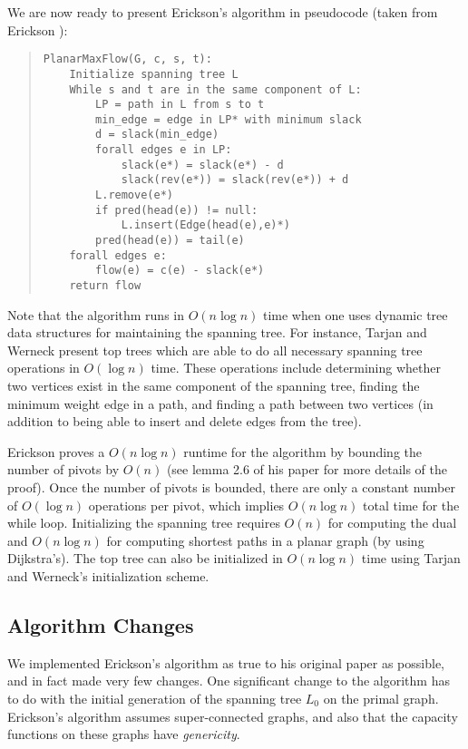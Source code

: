 \documentclass[12pt]{article}
\begin{document}
We are now ready to present Erickson's algorithm in pseudocode (taken from Erickson \cite{erickson2010}):
\begin{quote}
\begin{verbatim}
PlanarMaxFlow(G, c, s, t):
    Initialize spanning tree L
    While s and t are in the same component of L:
        LP = path in L from s to t
        min_edge = edge in LP* with minimum slack
        d = slack(min_edge)
        forall edges e in LP:
            slack(e*) = slack(e*) - d
            slack(rev(e*)) = slack(rev(e*)) + d
        L.remove(e*)
        if pred(head(e)) != null:
            L.insert(Edge(head(e),e)*)
        pred(head(e)) = tail(e)
    forall edges e:
        flow(e) = c(e) - slack(e*)
    return flow
\end{verbatim}
\end{quote}

Note that the algorithm runs in $O(n \log n)$ time when one uses dynamic tree data structures for maintaining the spanning tree. For instance, Tarjan and Werneck \cite{tarjanwerneck2005} present top trees which are able to do all necessary spanning tree operations in $O(\log n)$ time. These operations include determining whether two vertices exist in the same component of the spanning tree, finding the minimum weight edge in a path, and finding a path between two vertices (in addition to being able to insert and delete edges from the tree). 

Erickson proves a $O(n \log n)$ runtime for the algorithm by bounding the number of pivots by $O(n)$ (see lemma 2.6 of his paper for more details of the proof). Once the number of pivots is bounded, there are only a constant number of $O(\log n)$ operations per pivot, which implies $O(n \log n)$ total time for the while loop. Initializing the spanning tree requires $O(n)$ for computing the dual and $O(n \log n)$ for computing shortest paths in a planar graph (by using Dijkstra's). The top tree can also be initialized in $O(n \log n)$ time using Tarjan and Werneck's initialization scheme.

\subsection{Algorithm Changes}

We implemented Erickson's algorithm as true to his original paper as possible, and in fact made very few changes.  One significant change to the algorithm has to do with the initial generation of the spanning tree $L_0$ on the primal graph.  Erickson's algorithm assumes super-connected graphs, and also that the capacity functions on these graphs have \emph{genericity}.
\end{document}
